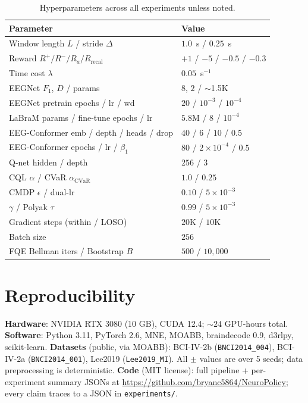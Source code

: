 \documentclass[conference]{IEEEtran}
\newcommand{\bcia}{BCI-IV-2a}
\newcommand{\bcib}{BCI-IV-2b}
\newcommand{\cql}{CQL}
\newcommand{\cvar}{\mathrm{CVaR}}
\begin{document}
\begin{table}[H]
\centering
\caption{Hyperparameters across all experiments unless noted.}
\label{tab:app:hp}
\footnotesize
\begin{tabular}{l l}
\toprule
Parameter & Value \\
\midrule
Window length $L$ / stride $\Delta$    & $1.0$~s / $0.25$~s \\
Reward $R^+ / R^- / R_a / R_{\text{recal}}$ & $+1$ / $-5$ / $-0.5$ / $-0.3$ \\
Time cost $\lambda$                     & $0.05$~s$^{-1}$ \\
EEGNet $F_1$, $D$ / params              & $8$, $2$ / $\sim$1.5K \\
EEGNet pretrain epochs / lr / wd        & $20$ / $10^{-3}$ / $10^{-4}$ \\
LaBraM params / fine-tune epochs / lr   & $5.8$M / $8$ / $10^{-4}$ \\
EEG-Conformer emb / depth / heads / drop & $40$ / $6$ / $10$ / $0.5$ \\
EEG-Conformer epochs / lr / $\beta_1$   & $80$ / $2\!\times\!10^{-4}$ / $0.5$ \\
Q-net hidden / depth                    & $256$ / $3$ \\
\cql{} $\alpha$ / CVaR $\alpha_{\cvar}$ & $1.0$ / $0.25$ \\
CMDP $\epsilon$ / dual-lr               & $0.10$ / $5\!\times\!10^{-3}$ \\
$\gamma$ / Polyak $\tau$                & $0.99$ / $5\!\times\!10^{-3}$ \\
Gradient steps (within / LOSO)          & $20$K / $10$K \\
Batch size                              & $256$ \\
FQE Bellman iters / Bootstrap $B$       & $500$ / $10{,}000$ \\
\bottomrule
\end{tabular}
\end{table}

\section{Reproducibility}\label{app:repro}

\textbf{Hardware}: NVIDIA RTX 3080 (10 GB), CUDA 12.4;
$\sim\!24$ GPU-hours total.
\textbf{Software}: Python 3.11, PyTorch 2.6, MNE, MOABB,
braindecode 0.9, d3rlpy, scikit-learn.
\textbf{Datasets} (public, via MOABB): \bcib{}
(\texttt{BNCI2014\_004}), \bcia{} (\texttt{BNCI2014\_001}), Lee2019
(\texttt{Lee2019\_MI}). All $\pm$ values are over 5 seeds; data
preprocessing is deterministic.
\textbf{Code} (MIT license): full pipeline + per-experiment
summary JSONs at
\url{https://github.com/bryanc5864/NeuroPolicy}; every
claim traces to a JSON in \texttt{experiments/}.
\end{document}
